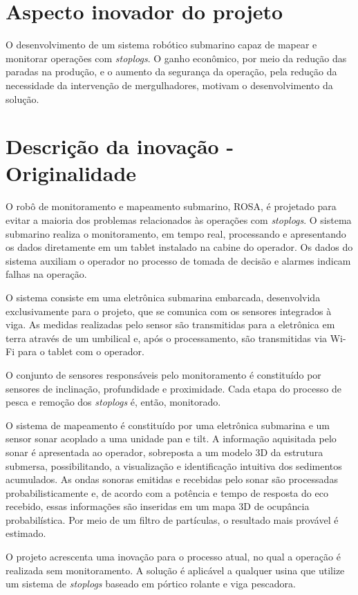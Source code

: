 \section{Aspecto inovador do projeto}

O desenvolvimento de um sistema robótico submarino capaz de mapear e monitorar
operações com \textit{stoplogs}. O ganho econômico, por meio da
redução das paradas na produção, e o aumento da segurança da operação,
pela redução da necessidade da intervenção de mergulhadores, motivam o
desenvolvimento da solução.

\section{Descrição da inovação - Originalidade}

O robô de monitoramento e mapeamento submarino, ROSA, é projetado para evitar a
maioria dos problemas relacionados às operações com \textit{stoplogs}. O sistema
submarino realiza o monitoramento, em tempo real, processando e apresentando os
dados diretamente em um tablet instalado na cabine do operador. Os dados do
sistema auxiliam o operador no processo de tomada de decisão e alarmes indicam
falhas na operação.

O sistema consiste em uma eletrônica submarina embarcada, desenvolvida
exclusivamente para o projeto, que se comunica com os sensores integrados à
viga. As medidas realizadas pelo sensor são transmitidas para a
eletrônica em terra através de um umbilical e, após o processamento, são
transmitidas via Wi-Fi para o tablet com o operador.

O conjunto de sensores responsáveis pelo monitoramento é constituído por
sensores de inclinação, profundidade e proximidade. Cada etapa do processo de
pesca e remoção dos \textit{stoplogs} é, então, monitorado.

O sistema de mapeamento é constituído por uma eletrônica submarina e um sensor
sonar acoplado a uma unidade pan e tilt. A informação aquisitada pelo sonar é
apresentada ao operador, sobreposta a um modelo 3D da estrutura submersa, possibilitando, a
visualização e identificação intuitiva dos sedimentos acumulados.
As ondas sonoras emitidas e recebidas pelo sonar são processadas 
probabilisticamente e, de acordo com a potência e tempo de resposta
do eco recebido, essas informações são inseridas em um mapa 3D de ocupância
probabilística. Por meio de um filtro de partículas, o resultado mais provável
é estimado.

O projeto acrescenta uma inovação para o processo atual, no qual a operação é
realizada sem monitoramento. A solução é aplicável a qualquer usina que utilize
um sistema de \textit{stoplogs} baseado em pórtico rolante e viga pescadora.


